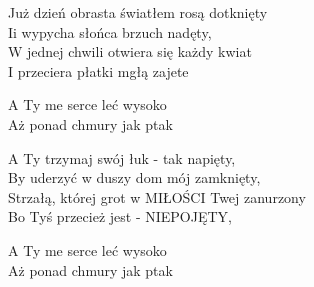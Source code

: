 \begin{text}
    Już dzień obrasta światłem rosą dotknięty\\
    Ii wypycha słońca brzuch nadęty,\\
    W jednej chwili otwiera się każdy kwiat\\
    I przeciera płatki mgłą zajete

    A Ty me serce leć wysoko\\
    Aż ponad chmury jak ptak

    A Ty trzymaj swój łuk - tak napięty,\\
    By uderzyć w duszy dom mój zamknięty,\\
    Strzałą, której grot w MIŁOŚCI Twej zanurzony\\
    Bo Tyś przecież jest - NIEPOJĘTY,

    A Ty me serce leć wysoko\\
    Aż ponad chmury jak ptak
\end{text}
\begin{chord}

\end{chord}